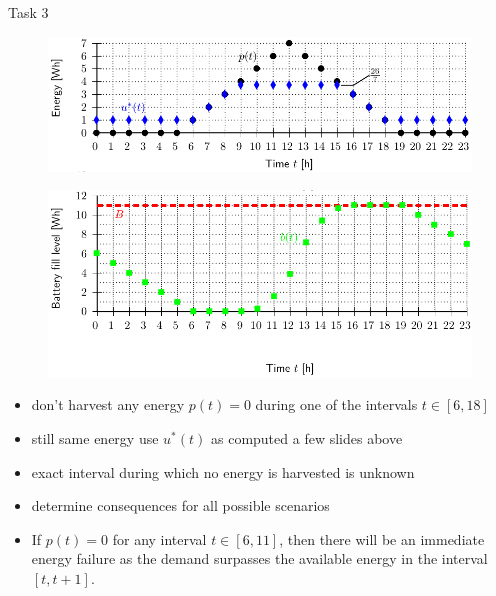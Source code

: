 \begin{frame}[allowframebreaks]{Task 3}{}
  \begin{solutionnoinc}
    \begin{figure}
      \centering
      \includegraphics[width=\textwidth]{./figures/task3_use_and_harvest.png}
    \end{figure}
  \end{solutionnoinc}
  \begin{solution}
    \begin{figure}
      \centering
      \includegraphics[width=\textwidth]{./figures/task3_battery.png}
    \end{figure}
  \end{solution}
  \framebreak
  \begin{tasknoinc}
    \begin{itemize}
      \item don't harvest any energy $p(t) = 0$ during one of the intervals $t\in[6, 18]$
      \item still same energy use $u^*(t)$ as computed a few slides above
      \item exact interval during which no energy is harvested is unknown
      \item determine consequences for all possible scenarios
    \end{itemize}
  \end{tasknoinc}
  \framebreak
  \begin{solution}
    \begin{itemize}
       \item If $p(t)=0$ for any interval $t \in[6,11]$, then there will be an immediate energy failure as the demand surpasses the available energy in the interval $[t, t+1]$.

\end{itemize}
\end{solution}
\end{frame}
